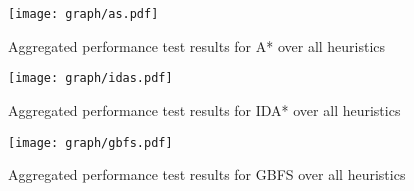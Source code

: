 \begin{figure}[h!]
  \centering
  \texttt{[image: graph/as.pdf]}
  \caption{Aggregated performance test results for A* over all heuristics}
  \label{fig:as}
\end{figure}

\begin{figure}[h!]
  \centering
  \texttt{[image: graph/idas.pdf]}
  \caption{Aggregated performance test results for IDA* over all heuristics}
  \label{fig:idas}
\end{figure}

\begin{figure}[h!]
  \centering
  \texttt{[image: graph/gbfs.pdf]}
  \caption{Aggregated performance test results for GBFS over all heuristics}
  \label{fig:gbfs}
\end{figure}
